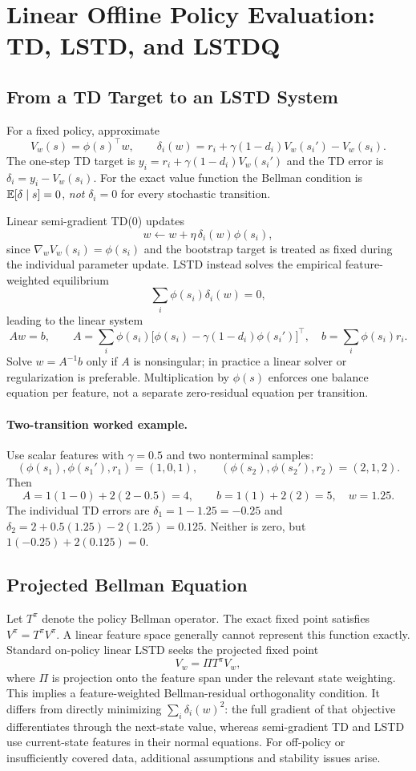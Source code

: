 \section{Linear Offline Policy Evaluation: TD, LSTD, and LSTDQ}
\subsection{From a TD Target to an LSTD System}
For a fixed policy, approximate
\[
V_w(s)=\phi(s)^\top w,\qquad
\delta_i(w)=r_i+\gamma(1-d_i)V_w(s_i')-V_w(s_i).
\]
The one-step TD target is $y_i=r_i+\gamma(1-d_i)V_w(s_i')$ and the TD error is $\delta_i=y_i-V_w(s_i)$. For the exact value function the Bellman condition is
$\mathbb{E}[\delta\mid s]=0$, \emph{not} $\delta_i=0$ for every stochastic transition.

Linear semi-gradient TD(0) updates
\[
w\leftarrow w+\eta\,\delta_i(w)\phi(s_i),
\]
since $\nabla_w V_w(s_i)=\phi(s_i)$ and the bootstrap target is treated as fixed during the individual parameter update. LSTD instead solves the empirical feature-weighted equilibrium
\[
\sum_i\phi(s_i)\delta_i(w)=0,
\]
leading to the linear system
\[
\boxed{Aw=b},\qquad
A=\sum_i\phi(s_i)\bigl[\phi(s_i)-\gamma(1-d_i)\phi(s_i')\bigr]^\top,\quad
b=\sum_i\phi(s_i)r_i.
\]
Solve $w=A^{-1}b$ only if $A$ is nonsingular; in practice a linear solver or regularization is preferable. Multiplication by $\phi(s)$ enforces one balance equation per feature, not a separate zero-residual equation per transition.

\paragraph{Two-transition worked example.}
Use scalar features with $\gamma=0.5$ and two nonterminal samples:
\[
(\phi(s_1),\phi(s_1'),r_1)=(1,0,1),\qquad
(\phi(s_2),\phi(s_2'),r_2)=(2,1,2).
\]
Then
\[
A=1(1-0)+2(2-0.5)=4,\qquad b=1(1)+2(2)=5,
\quad w=1.25.
\]
The individual TD errors are $\delta_1=1-1.25=-0.25$ and
$\delta_2=2+0.5(1.25)-2(1.25)=0.125$. Neither is zero, but
$1(-0.25)+2(0.125)=0$.

\subsection{Projected Bellman Equation}
Let $T^\pi$ denote the policy Bellman operator. The exact fixed point satisfies $V^\pi=T^\pi V^\pi$. A linear feature space generally cannot represent this function exactly. Standard on-policy linear LSTD seeks the projected fixed point
\[
\boxed{V_w=\Pi T^\pi V_w},
\]
where $\Pi$ is projection onto the feature span under the relevant state weighting. This implies a feature-weighted Bellman-residual orthogonality condition. It differs from directly minimizing $\sum_i\delta_i(w)^2$: the full gradient of that objective differentiates through the next-state value, whereas semi-gradient TD and LSTD use current-state features in their normal equations. For off-policy or insufficiently covered data, additional assumptions and stability issues arise.

